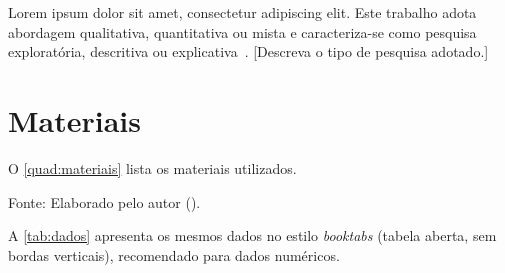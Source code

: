 
Lorem ipsum dolor sit amet, consectetur adipiscing elit. Este trabalho adota
abordagem qualitativa, quantitativa ou mista e caracteriza-se como pesquisa
exploratória, descritiva ou explicativa~\parencite{exemplo-livro}. [Descreva o
tipo de pesquisa adotado.]

\section{Materiais}
\label{sec:materiais}

O \autoref{quad:materiais} lista os materiais utilizados.

\begin{quadro}[!htb]
  \centering
  {Fonte: Elaborado pelo autor (\the\year{}).}
\end{quadro}

A \autoref{tab:dados} apresenta os mesmos dados no estilo \textit{booktabs}
(tabela aberta, sem bordas verticais), recomendado para dados numéricos.

